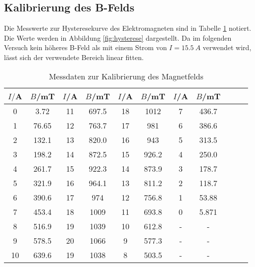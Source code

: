 \subsection{Kalibrierung des B-Felds}
Die Messwerte zur Hysteresekurve des Elektromagneten sind in Tabelle \ref{tab:hysterese} notiert.
Die Werte werden in Abbildung \ref{fig:hysterese} dargestellt.
Da im folgenden Versuch kein höheres B-Feld als mit einem Strom von $I=\SI{15.5}{A}$ verwendet wird, lässt sich der verwendete Bereich linear fitten.
%
%
\begin{table}[h!]
  \centering
  \caption{Messdaten zur Kalibrierung des Magnetfelds}
  \label{tab:hysterese}
  \begin{tabular}{c c c c c c c c c c c}
    \toprule
      $I/$A   &   $B$/mT  &  $I$/A   & $B$/mT &  $I$/A   & $B$/mT &  $I$/A   & $B$/mT\\
      \midrule
      0     &   3.72    &   11    &   697.5   &    18    &   1012      &    7     &   436.7    \\
      1     &   76.65   &   12    &   763.7   &    17    &   981       &    6     &   386.6    \\
      2     &   132.1   &   13    &   820.0   &    16    &   943       &    5     &   313.5    \\
      3     &   198.2   &   14    &   872.5   &    15    &   926.2     &    4     &   250.0    \\
      4     &   261.7   &   15    &   922.3   &    14    &   873.9     &    3     &   178.7    \\
      5     &   321.9   &   16    &   964.1   &    13    &   811.2     &    2     &   118.7    \\
      6     &   390.6   &   17    &   974     &    12    &   756.8     &    1     &   53.88    \\
      7     &   453.4   &   18    &   1009    &    11    &   693.8     &    0     &   5.871    \\
      8     &   516.9   &   19    &   1039    &    10    &   612.8     &    -     &      -     \\
      9     &   578.5   &   20    &   1066    &    9     &   577.3     &    -     &      -     \\
      10    &   639.6   &   19    &   1038    &    8     &   503.5     &    -     &      -     \\
    \bottomrule
  \end{tabular}
\end{table}
